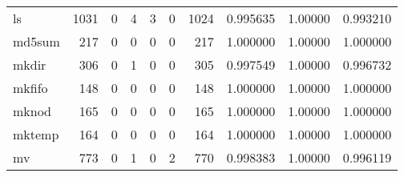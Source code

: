 \begin{tabular}{lrrrrrrrrr}
ls        &                   1031 &                                  0 &                                 4 &                                3 &                                 0 &                            1024 &                                0.995635 &                                1.00000 &                             0.993210 \\
md5sum    &                    217 &                                  0 &                                 0 &                                0 &                                 0 &                             217 &                                1.000000 &                                1.00000 &                             1.000000 \\
mkdir     &                    306 &                                  0 &                                 1 &                                0 &                                 0 &                             305 &                                0.997549 &                                1.00000 &                             0.996732 \\
mkfifo    &                    148 &                                  0 &                                 0 &                                0 &                                 0 &                             148 &                                1.000000 &                                1.00000 &                             1.000000 \\
mknod     &                    165 &                                  0 &                                 0 &                                0 &                                 0 &                             165 &                                1.000000 &                                1.00000 &                             1.000000 \\
mktemp    &                    164 &                                  0 &                                 0 &                                0 &                                 0 &                             164 &                                1.000000 &                                1.00000 &                             1.000000 \\
mv        &                    773 &                                  0 &                                 1 &                                0 &                                 2 &                             770 &                                0.998383 &                                1.00000 &                             0.996119 \\

\end{tabular}
